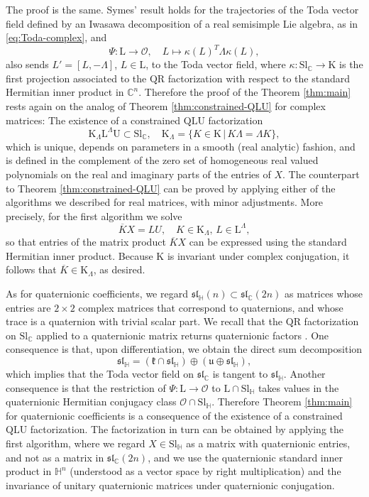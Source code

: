\documentclass[reqno]{amsart}
\newcommand{\uu}{\mathfrak{u}}
\renewcommand{\sl}{\mathfrak{sl}}
\newcommand{\cO}{\mathcal{O}}
\newcommand{\C}{\mathbb{C}}
\newcommand{\Sl}{\mathrm{Sl}}
\renewcommand{\L}{\mathrm{L}}
\newcommand{\U}{\mathrm{U}}
\theoremstyle{definition} %
\begin{document}
The proof is the same. Symes' result holds for the trajectories of the Toda vector field defined by an Iwasawa decomposition of a real semisimple Lie algebra, as in \eqref{eq:Toda-complex}, and
\[\Psi:\L\to \cO,\quad L\mapsto \kappa(L)^T\Lambda\kappa(L),\]
also sends $L'=[L,-\Lambda]$, $L\in \L$, to the Toda vector field, where $\kappa:\Sl_\mathbb{C}\to \mathrm{K}$ is the first projection associated to the $\mathrm{QR}$ factorization with respect to the standard Hermitian inner product in $\C^n$. Therefore the proof of the Theorem \ref{thm:main} rests again on the analog of Theorem \ref{thm:constrained-QLU} for complex matrices: The existence of a constrained $\mathrm{Q}\L\U$ factorization
\[\mathrm{K}_\Lambda \L^\Lambda \U\subset \Sl_\C, \quad \mathrm{K}_\Lambda=\{K\in \mathrm{K}\,|\, K\Lambda=\Lambda K\},\]
which is unique, depends on parameters in a smooth (real analytic) fashion, and is defined in the complement of the zero set of  homogeneous real valued polynomials on the real and imaginary parts of the entries of $X$. The counterpart to Theorem \ref{thm:constrained-QLU}  can be proved by applying either of the algorithms we described for real matrices, with minor adjustments. More precisely, for the first algorithm we solve
\[\overline{K}X=LU,\quad K\in \mathrm{K}_\Lambda,\,L\in \L^\Lambda,\]
so that entries of the matrix product   $\overline{K} X$ can be expressed using the standard Hermitian inner product. Because $\mathrm{K}$ is invariant under complex conjugation, it follows that $\overline{K}\in \mathrm{K}_\Lambda$, as desired.


As for quaternionic coefficients, we regard $\sl_\mathbb{H}(n)\subset \sl_\C(2n)$ as
matrices whose entries are $2\times 2$ complex matrices that correspond to quaternions, and whose trace is a quaternion with trivial scalar part. We recall that the $\mathrm{QR}$ factorization on $\Sl_\C$ applied to a quaternionic matrix returns quaternionic factors \cite{Sa}. One  consequence is that, upon differentiation, we obtain the direct sum decomposition
\[\sl_\mathbb{H}=(\mathfrak{k}\cap  \sl_\mathbb{H}) \oplus (\uu\oplus \sl_\mathbb{H}),\]
which implies that the Toda vector field on $\sl_\C$ is tangent to $\sl_\mathbb{H}$.
Another consequence is  that the restriction of $\Psi:\L\to \cO$ to $\L\cap \Sl_\mathbb{H}$ takes values in the quaternionic Hermitian conjugacy class $\cO\cap \Sl_\mathbb{H}$. Therefore Theorem \ref{thm:main} for quaternionic coefficients is a consequence of the existence of a  constrained $\mathrm{Q}\L\U$ factorization. The factorization in turn can be obtained by applying the first algorithm, where we  regard $X\in \Sl_\mathbb{H}$ as a matrix with quaternionic entries, and not as a matrix in $\sl_{\C}(2n)$, and we use the quaternionic standard inner product in $\mathbb{H}^n$ (understood as a vector space by right multiplication) and the invariance of unitary quaternionic matrices under quaternionic conjugation.
\end{document}

